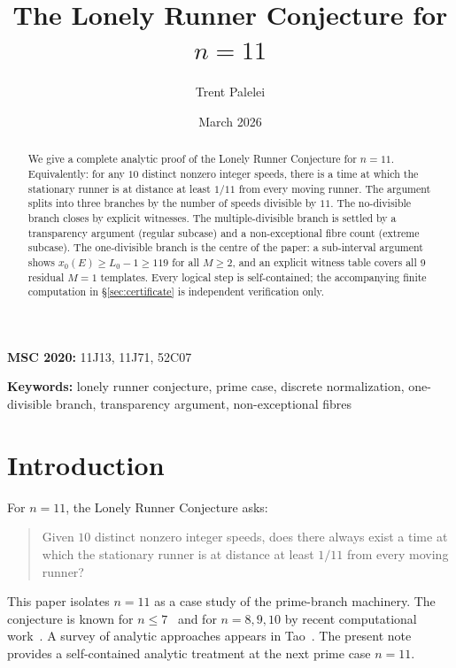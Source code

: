 \documentclass[11pt]{article}
\theoremstyle{definition}
\begin{document}
\title{The Lonely Runner Conjecture for $n = 11$}

\author{Trent Palelei}

\date{March 2026}

\maketitle

\begin{abstract}
We give a complete analytic proof of the Lonely Runner Conjecture for
$n = 11$. Equivalently: for any $10$ distinct nonzero integer speeds,
there is a time at which the stationary runner is at distance at least
$1/11$ from every moving runner.
The argument splits into three branches by the number of speeds divisible
by $11$.
The no-divisible branch closes by explicit witnesses.
The multiple-divisible branch is settled by a transparency argument
(regular subcase) and a non-exceptional fibre count (extreme subcase).
The one-divisible branch is the centre of the paper: a sub-interval
argument shows $x_0(E) \geq L_0 - 1 \geq 119$ for all $M \geq 2$, and
an explicit witness table covers all 9 residual $M = 1$ templates.
Every logical step is self-contained; the accompanying finite computation
in \S\ref{sec:certificate} is independent verification only.
\end{abstract}

\medskip
\noindent
\textbf{MSC 2020:} 11J13, 11J71, 52C07

\medskip
\noindent
\textbf{Keywords:} lonely runner conjecture, prime case, discrete
normalization, one-divisible branch, transparency argument,
non-exceptional fibres

\tableofcontents

\section{Introduction}
\label{sec:intro}

For $n = 11$, the Lonely Runner Conjecture asks:
\begin{quote}
  Given $10$ distinct nonzero integer speeds, does there always exist a
  time at which the stationary runner is at distance at least $1/11$
  from every moving runner?
\end{quote}

This paper isolates $n = 11$ as a case study of the prime-branch
machinery.
The conjecture is known for $n \leq 7$~\cite{Wil67,Cus73,BGG+98,BH01,BS08}
and for $n = 8, 9, 10$ by recent computational work~\cite{Ros25,Tra25}.
A survey of analytic approaches appears in Tao~\cite{Tao18}.
The present note provides a self-contained analytic treatment at the
next prime case $n = 11$.
\end{document}
